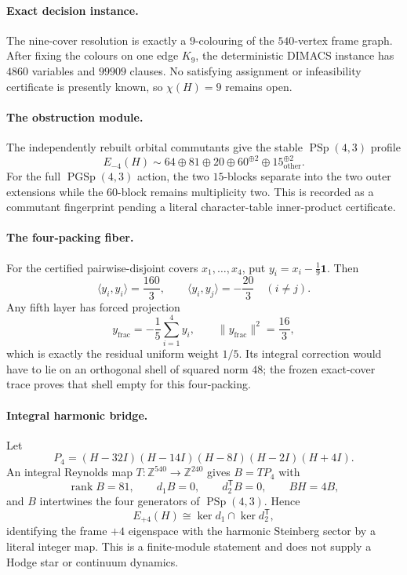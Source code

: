 \begingroup
\makeatletter
{}
\makeatother
\paragraph{Exact decision instance.}
The nine-cover resolution is exactly a $9$-colouring of the $540$-vertex frame graph. After fixing the colours on one edge $K_9$, the deterministic DIMACS instance has $4860$ variables and $99909$ clauses. No satisfying assignment or infeasibility certificate is presently known, so $\chi(H)=9$ remains open.
\paragraph{The obstruction module.}
The independently rebuilt orbital commutants give the stable $\operatorname{PSp}(4,3)$ profile
\[
E_{-4}(H)\sim64\oplus81\oplus20\oplus60^{\oplus2}\oplus15_{\mathrm{other}}^{\oplus2}.
\]
For the full $\operatorname{PGSp}(4,3)$ action, the two $15$-blocks separate into the two outer extensions while the $60$-block remains multiplicity two. This is recorded as a commutant fingerprint pending a literal character-table inner-product certificate.
\paragraph{The four-packing fiber.}
For the certified pairwise-disjoint covers $x_1,\ldots,x_4$, put $y_i=x_i-\frac19\mathbf1$. Then
\[
\langle y_i,y_i\rangle=\frac{160}{3},\qquad \langle y_i,y_j\rangle=-\frac{20}{3}\quad(i\neq j).
\]
Any fifth layer has forced projection
\[
y_{\mathrm{frac}}=-\frac15\sum_{i=1}^4y_i,\qquad \|y_{\mathrm{frac}}\|^2=\frac{16}{3},
\]
which is exactly the residual uniform weight $1/5$. Its integral correction would have to lie on an orthogonal shell of squared norm $48$; the frozen exact-cover trace proves that shell empty for this four-packing.
\paragraph{Integral harmonic bridge.}
Let
\[
P_4=(H-32I)(H-14I)(H-8I)(H-2I)(H+4I).
\]
An integral Reynolds map $T:\mathbb Z^{540}\to\mathbb Z^{240}$ gives $B=TP_4$ with
\[
\operatorname{rank}B=81,\qquad d_1B=0,\qquad d_2^{\mathsf T}B=0,\qquad BH=4B,
\]
and $B$ intertwines the four generators of $\operatorname{PSp}(4,3)$. Hence
\[
\boxed{E_{+4}(H)\cong\ker d_1\cap\ker d_2^{\mathsf T}},
\]
identifying the frame $+4$ eigenspace with the harmonic Steinberg sector by a literal integer map. This is a finite-module statement and does not supply a Hodge star or continuum dynamics.
\endgroup

